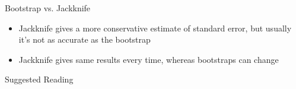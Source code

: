 \begin{frame}{Bootstrap vs. Jackknife}
    \begin{itemize}
        \item Jackknife gives a more conservative estimate of standard error, but usually it's not as accurate as the bootstrap
        \item Jackknife gives same results every time, whereas bootstraps can change
    \end{itemize}
\end{frame}



\nocite{Fisher1935,Pitman1937,Pitman1937a,Pitman1938}

\begin{frame}[allowframebreaks]{Suggested Reading}
    
\end{frame}



